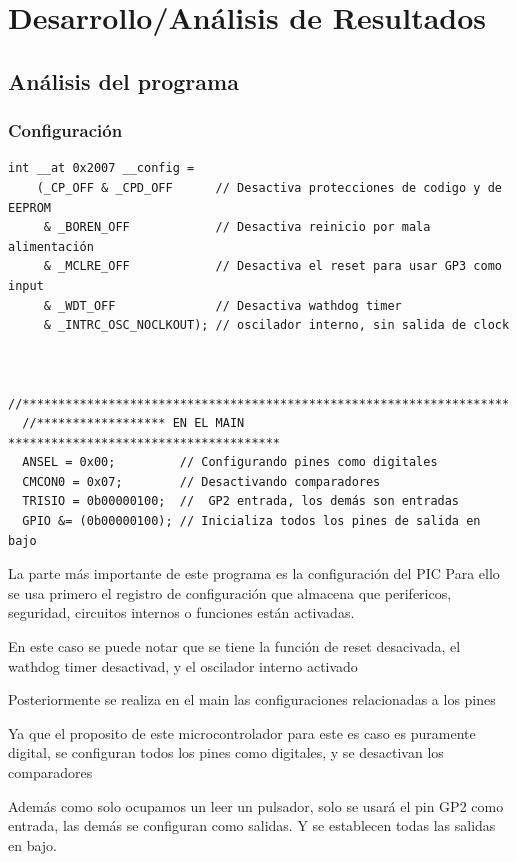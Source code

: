 \documentclass[12pt,a4paper]{article}
\begin{document}
\section{Desarrollo/Análisis de Resultados}
\subsection{Análisis del programa}
\subsubsection{Configuración}


\begin{verbatim}
int __at 0x2007 __config =
    (_CP_OFF & _CPD_OFF      // Desactiva protecciones de codigo y de EEPROM
     & _BOREN_OFF            // Desactiva reinicio por mala alimentación
     & _MCLRE_OFF            // Desactiva el reset para usar GP3 como input
     & _WDT_OFF              // Desactiva wathdog timer
     & _INTRC_OSC_NOCLKOUT); // oscilador interno, sin salida de clock


  //********************************************************************
  //****************** EN EL MAIN **************************************
  ANSEL = 0x00;         // Configurando pines como digitales
  CMCON0 = 0x07;        // Desactivando comparadores
  TRISIO = 0b00000100;  //  GP2 entrada, los demás son entradas
  GPIO &= (0b00000100); // Inicializa todos los pines de salida en bajo

\end{verbatim}

La parte más importante de este programa es la configuración del PIC
Para ello se usa primero el registro de configuración que almacena que perifericos,
seguridad, circuitos internos o funciones están activadas.

En este caso se puede notar que se tiene la función de reset desacivada,
el wathdog timer desactivad, y el oscilador interno activado

Posteriormente se realiza en el main las configuraciones relacionadas a los pines

Ya que el proposito de este microcontrolador para este es caso es puramente digital,
se configuran todos los pines como digitales, y se desactivan los comparadores

Además como solo ocupamos un leer un pulsador, solo se usará el pin GP2 como entrada,
las demás se configuran como salidas. Y se establecen todas las salidas en bajo.
\end{document}
